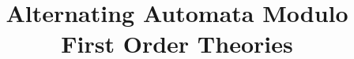 \documentclass{llncs}
\newif\ifLongVersion\LongVersionfalse
\begin{document}

\setlength{\belowdisplayskip}{2pt} \setlength{\belowdisplayshortskip}{1pt}
\setlength{\abovedisplayskip}{2pt} \setlength{\abovedisplayshortskip}{1pt}

\title{Alternating Automata Modulo First Order Theories}

\ifLongVersion
\author{Radu Iosif and Xiao Xu}
\institute{
  CNRS, Verimag, Universit\'e de Grenoble Alpes \\
  Email: \{Radu.Iosif,Xiao.Xu\}@univ-grenoble-alpes.fr
}
\else
\author{ }
\institute{ }
\fi

\maketitle
\vspace*{-2\baselineskip}



 

\newpage
\appendix


\end{document}
